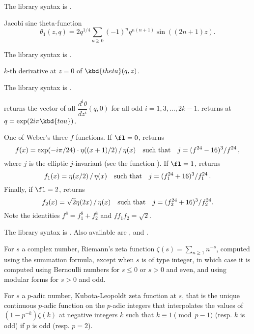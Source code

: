 The library syntax is .

\label{se:theta}
Jacobi sine theta-function
$$ \theta_1(z, q) = 2q^{1/4} \sum_{n\geq 0} (-1)^n q^{n(n+1)} \sin((2n+1)z).$$

The library syntax is .

\label{se:thetanullk}
$k$-th derivative at $z=0$ of $\kbd{theta}(q,z)$.

The library syntax is .

 returns the vector
of all $\dfrac{d^i\theta}{dz^i}(q,0)$ for all odd $i = 1, 3, \dots, 2k-1$.
 returns
 at $q = \exp(2i\pi \kbd{tau})$.

\label{se:weber}
One of Weber's three $f$ functions.
If $\fl=0$, returns
$$f(x)=\exp(-i\pi/24)\cdot\eta((x+1)/2)\,/\,\eta(x) \quad\hbox{such that}\quad
j=(f^{24}-16)^3/f^{24}\,,$$
where $j$ is the elliptic $j$-invariant  (see the function ).
If $\fl=1$, returns
$$f_1(x)=\eta(x/2)\,/\,\eta(x)\quad\hbox{such that}\quad
j=(f_1^{24}+16)^3/f_1^{24}\,.$$
Finally, if $\fl=2$, returns
$$f_2(x)=\sqrt{2}\eta(2x)\,/\,\eta(x)\quad\hbox{such that}\quad
j=(f_2^{24}+16)^3/f_2^{24}.$$
Note the identities $f^8=f_1^8+f_2^8$ and $ff_1f_2=\sqrt2$.

The library syntax is .
Also available are ,
 and .

\label{se:zeta}
For $s$ a complex number, Riemann's zeta
function  $\zeta(s)=\sum_{n\ge1}n^{-s}$,
computed using the  summation formula, except
when $s$ is of type integer, in which case it is computed using
Bernoulli numbers for $s\le0$ or $s>0$ and
even, and using modular forms for $s>0$ and odd.

For $s$ a $p$-adic number, Kubota-Leopoldt zeta function at $s$, that
is the unique continuous $p$-adic function on the $p$-adic integers
that interpolates the values of $(1 - p^{-k}) \zeta(k)$ at negative
integers $k$ such that $k \equiv 1 \pmod{p-1}$ (resp. $k$ is odd) if
$p$ is odd (resp. $p = 2$).

